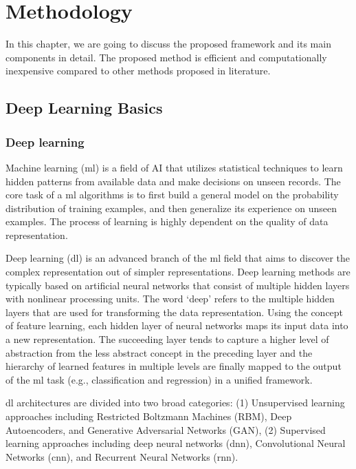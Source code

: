 \chapter{Methodology}\label{ch:methodology}
In this chapter, we are going to discuss the proposed framework and its main components in detail. The proposed method is efficient and computationally inexpensive compared to other methods proposed in literature. 


\section{Deep Learning Basics}
\subsection{Deep learning}
Machine learning (\gls{ml}) is a field of AI that utilizes statistical techniques to learn hidden patterns from available data and make decisions on unseen records. The core task of a \gls{ml} algorithms is to first build a general model on the probability distribution of training examples, and then generalize its experience on unseen examples. The process of learning is highly dependent on the quality of data representation.

Deep learning (\gls{dl}) is an advanced branch of the \gls{ml} field that aims to discover the complex representation out of simpler representations. Deep learning methods are typically based on artificial neural networks that consist of multiple hidden layers with nonlinear processing units. The word ‘deep’ refers to the multiple hidden layers that are used for transforming the data representation. Using the concept of feature learning, each hidden layer of neural networks maps its input data into a new representation. The succeeding layer tends to capture a higher level of abstraction from the less abstract concept in the preceding layer and the hierarchy of learned features in multiple levels are finally mapped to the output of the \gls{ml} task (e.g., classification and regression) in a unified framework.

\gls{dl} architectures are divided into two broad categories: (1) Unsupervised learning approaches including Restricted Boltzmann Machines (RBM), Deep Autoencoders, and Generative Adversarial Networks (GAN), (2) Supervised learning approaches including deep neural networks (\gls{dnn}), Convolutional Neural Networks (\gls{cnn}), and Recurrent Neural Networks (\gls{rnn}).

